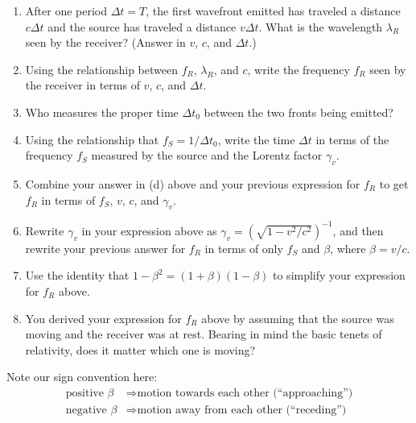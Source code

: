\begin{enumerate}[labparts]
\item After one period $\Delta t=T$, the first wavefront emitted has traveled a distance $c\Delta t$ and the source has traveled a distance $v\Delta t$.  What is the wavelength $\lambda_R$ seen by the receiver?  (Answer in $v$, $c$, and $\Delta t$.)
\answerspace{0.3in}

\item Using the relationship between $f_R$, $\lambda_R$, and $c$, write the frequency $f_R$ seen by the receiver  in terms of $v$, $c$, and $\Delta t$.
\answerspace{0.3in}

\item Who measures the proper time $\Delta t_0$ between the two fronts being emitted?
\answerspace{0.3in}

\item Using the relationship that $f_S=1/\Delta t_0$, write the time $\Delta t$ in terms of the frequency $f_S$ measured by the source and the Lorentz factor $\gamma_v$.
\answerspace{0.3in}

\item Combine your answer in (d) above and your previous expression for $f_R$ to get $f_R$ in terms of $f_S$, $v$, $c$, and $\gamma_v$.
\answerspace{0.8in}

\pagebreak[3]

\item Rewrite $\gamma_v$ in your expression above as $\gamma_v = \left(\sqrt{1 - v^2/c^2} \right)^{-1}$, and then rewrite your previous answer for $f_R$ in terms of only $f_S$ and $\beta$, where $\beta = v/c$.
\answerspace{0.8in}

\item Use the identity that $1 - \beta^2 = (1 + \beta)(1 - \beta)$ to simplify your expression for $f_R$ above.
\answerspace{1.0in}

\item You derived your expression for $f_R$ above by assuming that the source was moving and the receiver was at rest.  Bearing in mind the basic tenets of relativity, does it matter which one is moving?

\end{enumerate}

\vfill

Note our sign convention here:
\begin{align*}
\textrm{positive } \beta &\Longrightarrow \textrm{motion towards each other (``approaching'')} \\
\textrm{negative } \beta &\Longrightarrow \textrm{motion away from each other (``receding'')} 
\end{align*}
